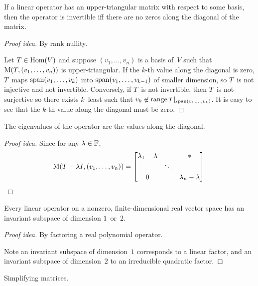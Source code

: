 \begin{thm}
If a linear operator has an upper-triangular matrix with respect to some basis, then the operator is invertible iff there are no zeros along the diagonal of the matrix.
\end{thm}
\begin{proof}[Proof idea]
By rank nullity.

Let \(T\in\operatorname{Hom}(V)\) and suppose \((v_1,\ldots,v_n)\) is a basis of~\(V\) such that \(\operatorname{M}(T,(v_1,\ldots,v_n))\) is upper-triangular. If the \(k\)-th value along the diagonal is zero, \(T\)~maps \(\operatorname{span}(v_1,\ldots,v_k)\) into \(\operatorname{span}(v_1,\ldots,v_{k-1})\) of smaller dimension, so \(T\)~is not injective and not invertible. Conversely, if \(T\)~is not invertible, then \(T\)~is not surjective so there exists \(k\)~least such that \(v_k\not\in\operatorname{range} T|_{\operatorname{span}(v_1,\ldots,v_k)}\). It is easy to see that the \(k\)-th value along the diagonal must be zero.
\end{proof}

\begin{cor}
The eigenvalues of the operator are the values along the diagonal.
\end{cor}
\begin{proof}[Proof idea]
Since for any \(\lambda\in\mathbb{F}\),
\begin{equation*}
\operatorname{M}(T-\lambda I,(v_1,\ldots,v_n))=\left[\begin{matrix}
\lambda_1-\lambda&&*\\
&\ddots&\\
0&&\lambda_n-\lambda
\end{matrix}\right]\qedhere
\end{equation*}
\end{proof}

\begin{thm}
Every linear operator on a nonzero, finite-dimensional real vector space has an invariant subspace of dimension \(1\)~or~\(2\).
\end{thm}
\begin{proof}[Proof idea]
By factoring a real polynomial operator.

Note an invariant subspace of dimension~\(1\) corresponds to a linear factor, and an invariant subspace of dimension~\(2\) to an irreducible quadratic factor.
\end{proof}
\begin{app}
Simplifying matrices.
\end{app}

